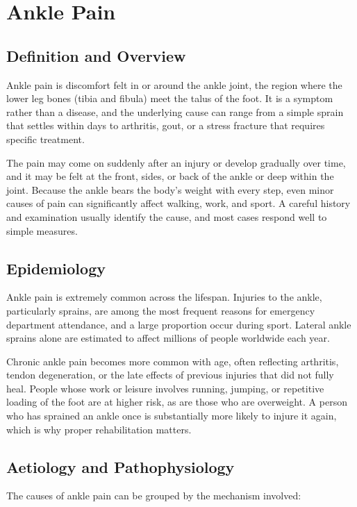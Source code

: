 \chapter{Ankle Pain}

\section*{Definition and Overview}
Ankle pain is discomfort felt in or around the ankle joint, the region where the lower leg bones (tibia and fibula) meet the talus of the foot. It is a symptom rather than a disease, and the underlying cause can range from a simple sprain that settles within days to arthritis, gout, or a stress fracture that requires specific treatment.

The pain may come on suddenly after an injury or develop gradually over time, and it may be felt at the front, sides, or back of the ankle or deep within the joint. Because the ankle bears the body's weight with every step, even minor causes of pain can significantly affect walking, work, and sport. A careful history and examination usually identify the cause, and most cases respond well to simple measures.

\section*{Epidemiology}
Ankle pain is extremely common across the lifespan. Injuries to the ankle, particularly sprains, are among the most frequent reasons for emergency department attendance, and a large proportion occur during sport. Lateral ankle sprains alone are estimated to affect millions of people worldwide each year.

Chronic ankle pain becomes more common with age, often reflecting arthritis, tendon degeneration, or the late effects of previous injuries that did not fully heal. People whose work or leisure involves running, jumping, or repetitive loading of the foot are at higher risk, as are those who are overweight. A person who has sprained an ankle once is substantially more likely to injure it again, which is why proper rehabilitation matters.

\section*{Aetiology and Pathophysiology}
The causes of ankle pain can be grouped by the mechanism involved:

